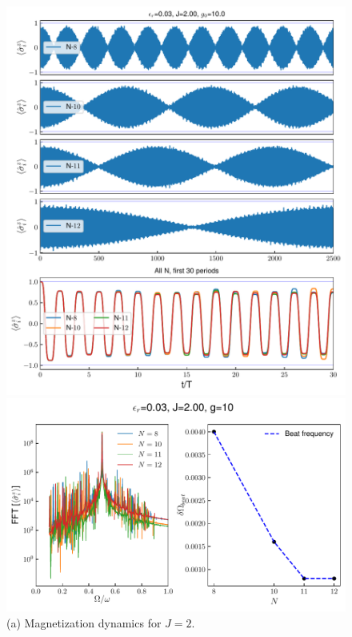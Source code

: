 \documentclass[a4paper, 11pt]{article}
\begin{document}
\begin{figure}[h!]
    \centering
    \begin{minipage}[t]{0.48\textwidth} 
        \centering
        \includegraphics[width=\textwidth]{time_mag_epsilon_r0.03_J2.00_g10.0_allN.pdf}
        \caption*{(a) Magnetization dynamics for $J = 2$.}
    \end{minipage}
    \hfill
    \begin{minipage}[t]{0.48\textwidth}
        \centering
        \includegraphics[width=\textwidth]{DTC_mag_fft_beat_er=0.03_J=2_g=10.0.pdf}

\end{minipage}
\end{figure}
\end{document}
